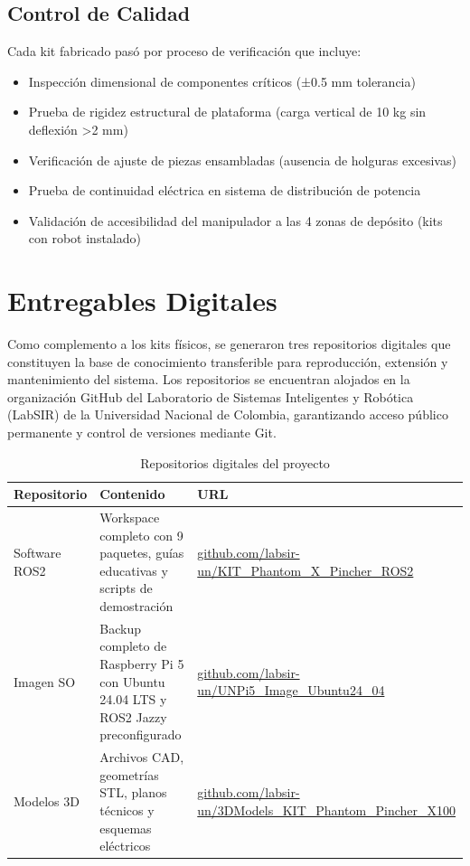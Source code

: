 \subsection{Control de Calidad}

Cada kit fabricado pasó por proceso de verificación que incluye:

\begin{itemize}
    \item Inspección dimensional de componentes críticos (±0.5 mm tolerancia)
    \item Prueba de rigidez estructural de plataforma (carga vertical de 10 kg sin deflexión >2 mm)
    \item Verificación de ajuste de piezas ensambladas (ausencia de holguras excesivas)
    \item Prueba de continuidad eléctrica en sistema de distribución de potencia
    \item Validación de accesibilidad del manipulador a las 4 zonas de depósito (kits con robot instalado)
\end{itemize}

\section{Entregables Digitales}

Como complemento a los kits físicos, se generaron tres repositorios digitales que constituyen la base de conocimiento transferible para reproducción, extensión y mantenimiento del sistema. Los repositorios se encuentran alojados en la organización GitHub del Laboratorio de Sistemas Inteligentes y Robótica (LabSIR) de la Universidad Nacional de Colombia, garantizando acceso público permanente y control de versiones mediante Git.

\begin{table}[H]
\centering
\caption{Repositorios digitales del proyecto}
\label{tab:repositorios}
\small
\begin{tabular}{|l|p{6cm}|p{5.5cm}|}
\hline
\textbf{Repositorio} & \textbf{Contenido} & \textbf{URL} \\
\hline
Software ROS2 & Workspace completo con 9 paquetes, guías educativas y scripts de demostración & \url{github.com/labsir-un/KIT_Phantom_X_Pincher_ROS2} \\
\hline
Imagen SO & Backup completo de Raspberry Pi 5 con Ubuntu 24.04 LTS y ROS2 Jazzy preconfigurado & \url{github.com/labsir-un/UNPi5_Image_Ubuntu24_04} \\
\hline
Modelos 3D & Archivos CAD, geometrías STL, planos técnicos y esquemas eléctricos & \url{github.com/labsir-un/3DModels_KIT_Phantom_Pincher_X100} \\
\hline
\end{tabular}
\end{table}

